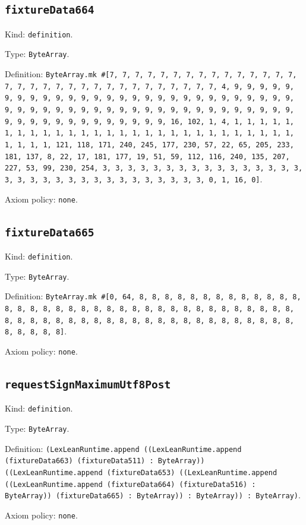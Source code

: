 \documentclass[11pt]{article}
\begin{document}
\subsection*{\texttt{fixtureData664}}
\noindent Kind: \texttt{definition}.\par
\noindent Type: \texttt{ByteArray}.\par
\noindent Definition: \texttt{ByteArray.mk \#[7, 7, 7, 7, 7, 7, 7, 7, 7, 7, 7, 7, 7, 7, 7, 7, 7, 7, 7, 7, 7, 7, 7, 7, 7, 7, 7, 7, 7, 7, 7, 7, 4, 9, 9, 9, 9, 9, 9, 9, 9, 9, 9, 9, 9, 9, 9, 9, 9, 9, 9, 9, 9, 9, 9, 9, 9, 9, 9, 9, 9, 9, 9, 9, 9, 9, 9, 9, 9, 9, 9, 9, 9, 9, 9, 9, 9, 9, 9, 9, 9, 9, 9, 9, 9, 9, 9, 9, 9, 9, 9, 9, 9, 9, 9, 9, 9, 16, 102, 1, 4, 1, 1, 1, 1, 1, 1, 1, 1, 1, 1, 1, 1, 1, 1, 1, 1, 1, 1, 1, 1, 1, 1, 1, 1, 1, 1, 1, 1, 1, 1, 1, 1, 121, 118, 171, 240, 245, 177, 230, 57, 22, 65, 205, 233, 181, 137, 8, 22, 17, 181, 177, 19, 51, 59, 112, 116, 240, 135, 207, 227, 53, 99, 230, 254, 3, 3, 3, 3, 3, 3, 3, 3, 3, 3, 3, 3, 3, 3, 3, 3, 3, 3, 3, 3, 3, 3, 3, 3, 3, 3, 3, 3, 3, 3, 3, 3, 0, 1, 16, 0]}.\par
\noindent Axiom policy: \texttt{none}.\par
\subsection*{\texttt{fixtureData665}}
\noindent Kind: \texttt{definition}.\par
\noindent Type: \texttt{ByteArray}.\par
\noindent Definition: \texttt{ByteArray.mk \#[0, 64, 8, 8, 8, 8, 8, 8, 8, 8, 8, 8, 8, 8, 8, 8, 8, 8, 8, 8, 8, 8, 8, 8, 8, 8, 8, 8, 8, 8, 8, 8, 8, 8, 8, 8, 8, 8, 8, 8, 8, 8, 8, 8, 8, 8, 8, 8, 8, 8, 8, 8, 8, 8, 8, 8, 8, 8, 8, 8, 8, 8, 8, 8, 8, 8]}.\par
\noindent Axiom policy: \texttt{none}.\par
\subsection*{\texttt{requestSignMaximumUtf8Post}}
\noindent Kind: \texttt{definition}.\par
\noindent Type: \texttt{ByteArray}.\par
\noindent Definition: \texttt{(LexLeanRuntime.append ((LexLeanRuntime.append (fixtureData663) (fixtureData511) : ByteArray)) ((LexLeanRuntime.append (fixtureData653) ((LexLeanRuntime.append ((LexLeanRuntime.append (fixtureData664) (fixtureData516) : ByteArray)) (fixtureData665) : ByteArray)) : ByteArray)) : ByteArray)}.\par
\noindent Axiom policy: \texttt{none}.\par
\end{document}
